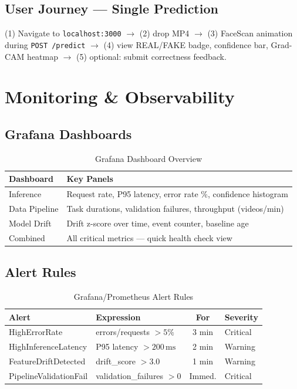 \documentclass[conference]{IEEEtran}
\begin{document}
\subsection{User Journey — Single Prediction}

(1) Navigate to \texttt{localhost:3000} $\to$ (2) drop MP4 $\to$ (3) FaceScan animation during \texttt{POST /predict} $\to$ (4) view REAL/FAKE badge, confidence bar, Grad-CAM heatmap $\to$ (5) optional: submit correctness feedback.

\section{Monitoring \& Observability}
\label{sec:monitoring}

\subsection{Grafana Dashboards}

\begin{table}[H]
\centering
\caption{Grafana Dashboard Overview}
\label{tab:grafana}
\begin{tabular}{@{}L{2.2cm}L{5.3cm}@{}}
\toprule
\textbf{Dashboard} & \textbf{Key Panels} \\
\midrule
Inference     & Request rate, P95 latency, error rate \%, confidence histogram \\
Data Pipeline & Task durations, validation failures, throughput (videos/min) \\
Model Drift   & Drift z-score over time, event counter, baseline age \\
Combined      & All critical metrics — quick health check view \\
\bottomrule
\end{tabular}
\end{table}

\subsection{Alert Rules}

\begin{table}[H]
\centering
\caption{Grafana/Prometheus Alert Rules}
\label{tab:alerts}
\begin{tabular}{@{}L{2.5cm}L{2.5cm}cL{1.2cm}@{}}
\toprule
\textbf{Alert} & \textbf{Expression} & \textbf{For} & \textbf{Severity} \\
\midrule
HighErrorRate           & errors/requests $> 5\%$    & 3 min & Critical \\
HighInferenceLatency    & P95 latency $> 200\,\text{ms}$ & 2 min & Warning \\
FeatureDriftDetected    & drift\_score $> 3.0$       & 1 min & Warning \\
PipelineValidationFail  & validation\_failures $> 0$ & Immed. & Critical \\
\bottomrule
\end{tabular}
\end{table}
\end{document}
